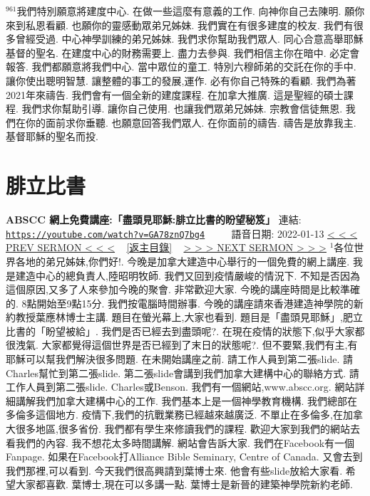 \documentclass{book}
\begin{document}
$^{961}$我們特別願意將建度中心.
在做一些這麼有意義的工作.
向神你自己去陳明.
願你來到私恩看顧.
也願你的靈感動眾弟兄姊妹.
我們實在有很多建度的校友.
我們有很多曾經受過.
中心神學訓練的弟兄姊妹.
我們求你幫助我們眾人.
同心合意高舉耶穌基督的聖名.
在建度中心的財務需要上.
盡力去參與.
我們相信主你在暗中.
必定會報答.
我們都願意將我們中心.
當中眾位的童工.
特別六穆師弟的交託在你的手中.
讓你使出聰明智慧.
讓整體的事工的發展,運作.
必有你自己特殊的看顧.
我們為著2021年來禱告.
我們會有一個全新的建度課程.
在加拿大推廣.
這是聖經的碩士課程.
我們求你幫助引導.
讓你自己使用.
也讓我們眾弟兄姊妹.
宗教會信徒無恩.
我們在你的面前求你垂聽.
也願意回答我們眾人.
在你面前的禱告.
禱告是放靠我主.
基督耶穌的聖名而投.
\newpage



\section{腓立比書}
\label{sec:GA78znQ7bg4}
\textbf{ABSCC 網上免費講座:「盡頭見耶穌:腓立比書的盼望秘笈」}
\newline
\newline
連結: \href{https://youtube.com/watch?v=GA78znQ7bg4}{\texttt{https://youtube.com/watch?v=GA78znQ7bg4}} ~~~~ 語音日期: 2022-01-13
\newline
\newline
\hyperref[sec:5]{\small{< < < PREV SERMON < < <}}
~
\hyperref[sec:index]{\small{[返主目錄]}}
~
\hyperref[sec:L8_DVqUvOSM]{\small{> > > NEXT SERMON > > >}}
\newline
\newline
$^{1}$各位世界各地的弟兄姊妹,你們好!.
今晚是加拿大建造中心舉行的一個免費的網上講座.
我是建造中心的總負責人,陸昭明牧師.
我們又回到疫情嚴峻的情況下.
不知是否因為這個原因,又多了人來參加今晚的聚會.
非常歡迎大家.
今晚的講座時間是比較準確的.
8點開始至9點15分.
我們按電腦時間辦事.
今晚的講座請來香港建造神學院的新約教授葉應林博士主講.
題目在螢光幕上,大家也看到.
題目是「盡頭見耶穌」,肥立比書的「盼望被給」.
我們是否已經去到盡頭呢?.
在現在疫情的狀態下,似乎大家都很洩氣.
大家都覺得這個世界是否已經到了末日的狀態呢?.
但不要緊,我們有主,有耶穌可以幫我們解決很多問題.
在未開始講座之前.
請工作人員到第二張slide.
請Charles幫忙到第二張slide.
第二張slide會講到我們加拿大建構中心的聯絡方式.
請工作人員到第二張slide.
Charles或Benson.
我們有一個網站,www.abscc.org.
網站詳細講解我們加拿大建構中心的工作.
我們基本上是一個神學教育機構.
我們總部在多倫多這個地方.
疫情下,我們的抗戰業務已經越來越廣泛.
不單止在多倫多,在加拿大很多地區,很多省份.
我們都有學生來修讀我們的課程.
歡迎大家到我們的網站去看我們的內容.
我不想花太多時間講解.
網站會告訴大家.
我們在Facebook有一個Fanpage.
如果在Facebook打Alliance Bible Seminary, Centre of Canada.
又會去到我們那裡,可以看到.
今天我們很高興請到葉博士來.
他會有些slide放給大家看.
希望大家都喜歡.
葉博士,現在可以多講一點.
葉博士是新晉的建築神學院新約老師.
\end{document}
